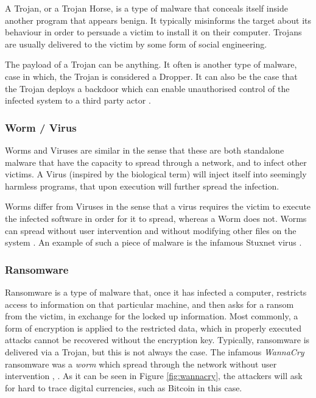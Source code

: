 A Trojan, or a Trojan Horse, is a type of malware that conceals itself inside another program that appears benign. It typically misinforms the target about its behaviour in order to persuade a victim to install it on their computer. Trojans are usually delivered to the victim by some form of social engineering. 

The payload of a Trojan can be anything. It often is another type of malware, case in which, the Trojan is considered a Dropper. It can also be the case that the Trojan deploys a backdoor which can enable unauthorised control of the infected system to a third party actor \cite{wiki_malware}.

\subsubsection{Worm / Virus}

Worms and Viruses are similar in the sense that these are both standalone malware that have the capacity to spread through a network, and to infect other victims. A Virus (inspired by the biological term) will inject itself into seemingly harmless programs, that upon execution will further spread the infection. 

Worms differ from Viruses in the sense that a virus requires the victim to execute the infected software in order for it to spread, whereas a Worm does not. Worms can spread without user intervention and without modifying other files on the system \cite{wiki_malware}. An example of such a piece of malware is the infamous Stuxnet virus \cite{stuxnet}.

\subsubsection{Ransomware}

Ransomware is a type of malware that, once it has infected a computer, restricts access to information on that particular machine, and then asks for a ransom from the victim, in exchange for the locked up information. Most commonly, a form of encryption is applied to the restricted data, which in properly executed attacks cannot be recovered without the encryption key. Typically, ransomware is delivered via a Trojan, but this is not always the case. The infamous \emph{WannaCry} ransomware was a \emph{worm} which spread through the network without user intervention \cite{wiki_wannacry}, \cite{wiki_ransomware}. As it can be seen in Figure \ref{fig:wannacry}, the attackers will ask for hard to trace digital currencies, such as Bitcoin in this case.

